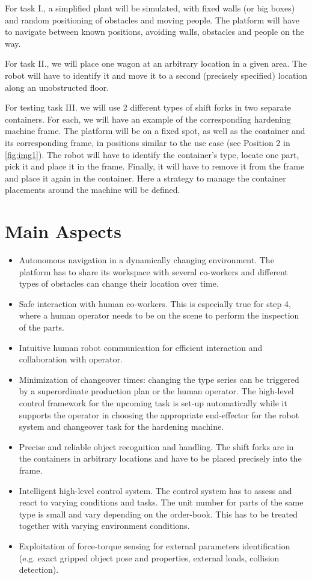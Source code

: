 \documentclass[11pt,english]{AMdocument}
\begin{document}
For task I., a simplified plant will be simulated, with fixed walls (or big boxes) and random positioning of obstacles and moving people. The platform will have to navigate between known positions, avoiding walls, obstacles and people on the way.

For task II., we will place one wagon at an arbitrary location in a given area. The robot will have to identify it and move it to a second (precisely specified) location along an unobstructed floor.

For testing task III. we will use 2 different types of shift forks in two separate containers. For each, we will have an example of the corresponding hardening machine frame. The platform will be on a fixed spot, as well as the container and its corresponding frame, in positions similar to the use case (see Position 2 in \cref{fig:img1}). The robot will have to identify the container’s type, locate one part, pick it and place it in the frame. Finally, it will have to remove it from the frame and place it again in the container. Here a strategy to manage the container placements around the machine will be defined.


	\section*{Main Aspects}

\begin{itemize}
	\item Autonomous navigation in a dynamically changing environment. The platform has to share its workspace with several co-workers and different types of obstacles can change their location over time.
	\item Safe interaction with human co-workers. This is especially true for step 4, where a human operator needs to be on the scene to perform the inspection of the parts.
	\item Intuitive human robot communication for efficient interaction and collaboration with operator. 
	\item Minimization of changeover times: changing the type series can be triggered by a superordinate production plan or the human operator. The high-level control framework for the upcoming task is set-up automatically while it supports the operator in choosing the appropriate end-effector for the robot system and changeover task for the hardening machine.
	\item Precise and reliable object recognition and handling. The shift forks are in the containers in arbitrary locations and have to be placed precisely into the frame.
	\item Intelligent high-level control system. The control system has to assess and react to varying conditions and tasks. The unit number for parts of the same type is small and vary depending on the order-book. This has to be treated together with varying environment conditions.
	\item Exploitation of force-torque sensing for external parameters identification (e.g. exact gripped object pose and properties, external loads, collision detection).
\end{itemize}
\end{document}
